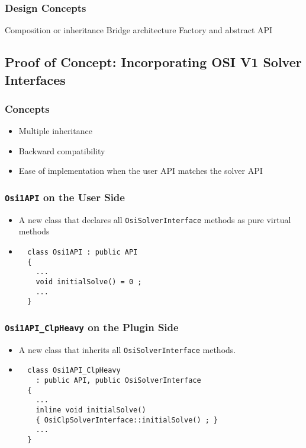\documentclass{beamer}
\begin{document}
\begin{frame}
  \frametitle{Design Concepts}

  Composition or inheritance
  Bridge architecture
  Factory and abstract API
\end{frame}

\subsection{Proof of Concept: Incorporating OSI V1 Solver
  Interfaces}

\begin{frame}
  \frametitle{Concepts}

  \begin{itemize}
  \item Multiple inheritance
  \item Backward compatibility
  \item Ease of implementation when the user API matches the solver API
  \end{itemize}

\end{frame}

\begin{frame}[fragile]
\frametitle{\lstinline|Osi1API| on the User Side}

\begin{itemize}
  \item
  A new class that declares all \lstinline|OsiSolverInterface| methods
  as pure virtual methods

  \item
  \begin{lstlisting}
  class Osi1API : public API
  {
    ...
    void initialSolve() = 0 ;
    ...
  }
  \end{lstlisting}
\end{itemize}
\end{frame}

\begin{frame}[fragile]
\frametitle{\lstinline|Osi1API_ClpHeavy| on the Plugin Side}

\begin{itemize}
  \item
  A new class that inherits all \lstinline|OsiSolverInterface| methods.

  \item
  \begin{lstlisting}
  class Osi1API_ClpHeavy
    : public API, public OsiSolverInterface
  {
    ...
    inline void initialSolve()
    { OsiClpSolverInterface::initialSolve() ; }
    ...
  }
  \end{lstlisting}
\end{itemize}
\end{frame}
\end{document}

